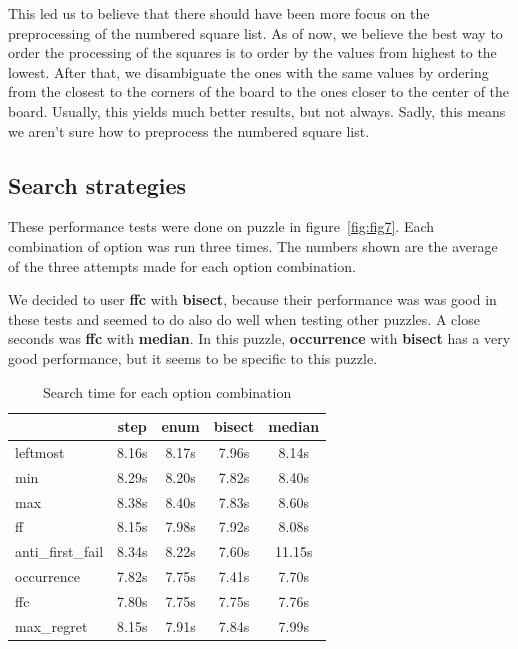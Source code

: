\documentclass[runningheads]{llncs}
\begin{document}
This led us to believe that there should have been more focus on the preprocessing
of the numbered square list. As of now, we believe the best way to order the
processing of the squares is to order by the values from highest to the lowest.
After that, we disambiguate the ones with the same values by ordering
from the closest to the corners of the board to the ones closer to the center of
the board. Usually, this yields much better results, but not always. Sadly,
this means we aren't sure how to preprocess the numbered square list.

\subsection{Search strategies}
These performance tests were done on puzzle in figure~\ref{fig:fig7}. Each combination
of option was run three times. The numbers shown are the average of the three
attempts made for each option combination.

We decided to user \textbf{ffc} with \textbf{bisect}, because their performance
was was good in these tests and seemed to do also do well when testing other
puzzles. A close seconds was \textbf{ffc} with \textbf{median}. In this puzzle,
\textbf{occurrence} with \textbf{bisect} has a very good performance, but it
seems to be specific to this puzzle.

\begin{table}
  \begin{center}
    \caption{Search time for each option combination}
    \label{tab:table1}
    \begin{tabular}{l|c|c|c|c}
          & step & enum & bisect & median\\
      \hline
        leftmost        & 8.16s & 8.17s & 7.96s  & 8.14s  \\
      \hline
        min             & 8.29s & 8.20s & 7.82s  & 8.40s  \\
      \hline
        max             & 8.38s & 8.40s & 7.83s  & 8.60s  \\
      \hline
        ff              & 8.15s & 7.98s & 7.92s  & 8.08s  \\
      \hline
        anti\_first\_fail & 8.34s & 8.22s & 7.60s  & 11.15s \\
      \hline
        occurrence      & 7.82s & 7.75s & 7.41s  & 7.70s  \\
      \hline
        ffc             & 7.80s & 7.75s & 7.75s  & 7.76s  \\
      \hline
        max\_regret      & 8.15s & 7.91s & 7.84s  & 7.99s  \\
    \end{tabular}
  \end{center}
\end{table}
\end{document}
